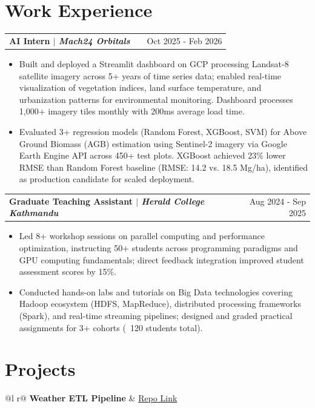 \documentclass[a4paper,12pt]{article}
\makeatletter
\newenvironment{joblong}[2]
    {
    \begin{tabularx}{\linewidth}{@{}l X r@{}}
    \textbf{#1} & \hfill &  #2 \\[3.75pt]
    \end{tabularx}
    \begin{minipage}[t]{\linewidth}
    \begin{itemize}[nosep,after=\strut, leftmargin=1em, itemsep=3pt,label=--]
    }
    {
    \end{itemize}
    \end{minipage}    
    }
\makeatother
\begin{document}
\section{Work Experience}
\begin{joblong}{AI Intern $|$ \normalfont\textit{Mach24 Orbitals}}{Oct 2025 - Feb 2026}
\item Built and deployed a Streamlit dashboard on GCP processing Landsat-8 satellite imagery across 5+ years of time series data; enabled real-time visualization of vegetation indices, land surface temperature, and urbanization patterns for environmental monitoring. Dashboard processes 1,000+ imagery tiles monthly with 200ms average load time.
\item Evaluated 3+ regression models (Random Forest, XGBoost, SVM) for Above Ground Biomass (AGB) estimation using Sentinel-2 imagery via Google Earth Engine API across 450+ test plots. XGBoost achieved 23\% lower RMSE than Random Forest baseline (RMSE: 14.2 vs. 18.5 Mg/ha), identified as production candidate for scaled deployment.    
\end{joblong}

\begin{joblong}{Graduate Teaching Assistant $|$ \normalfont\textit{Herald College Kathmandu}}{Aug 2024 - Sep 2025}
\item Led 8+ workshop sessions on parallel computing and performance optimization, instructing 50+ students across programming paradigms and GPU computing fundamentals; direct feedback integration improved student assessment scores by 15\%. 
\item Conducted hands-on labs and tutorials on Big Data technologies covering Hadoop ecosystem (HDFS, MapReduce), distributed processing frameworks (Spark), and real-time streaming pipelines; designed and graded practical assignments for 3+ cohorts (~120 students total).
\end{joblong}
\section{Projects}

\begin{tabularx}{\linewidth}{ @{}l r@{} }
\textbf{Weather ETL Pipeline} & \hfill \href{https://github.com/SiddhuShkya/Extract-Transform-Load}{Repo Link} \\[3.75pt]
  \\
\end{tabularx}
\end{document}
